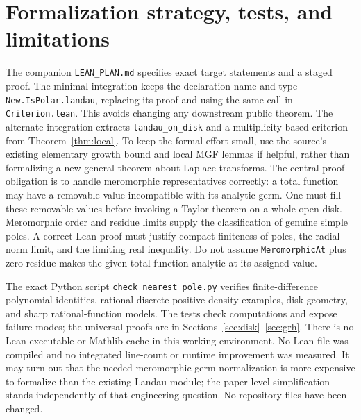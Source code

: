 \documentclass[11pt]{article}
\theoremstyle{remark}\newtheorem{remark}[theorem]{Remark}
\begin{document}
\section{Formalization strategy, tests, and limitations}\label{sec:formal}
The companion \texttt{LEAN\_PLAN.md} specifies exact target statements and a staged proof. The minimal integration keeps the declaration name and type \texttt{New.IsPolar.landau}, replacing its proof and using the same call in \texttt{Criterion.lean}. This avoids changing any downstream public theorem. The alternate integration extracts \texttt{landau\_on\_disk} and a multiplicity-based criterion from Theorem~\ref{thm:local}. To keep the formal effort small, use the source's existing elementary growth bound and local MGF lemmas if helpful, rather than formalizing a new general theorem about Laplace transforms. The central proof obligation is to handle meromorphic representatives correctly: a total function may have a removable value incompatible with its analytic germ. One must fill these removable values before invoking a Taylor theorem on a whole open disk. Meromorphic order and residue limits supply the classification of genuine simple poles. A correct Lean proof must justify compact finiteness of poles, the radial norm limit, and the limiting real inequality. Do not assume \texttt{MeromorphicAt} plus zero residue makes the given total function analytic at its assigned value.

The exact Python script \texttt{check\_nearest\_pole.py} verifies finite-difference polynomial identities, rational discrete positive-density examples, disk geometry, and sharp rational-function models. The tests check computations and expose failure modes; the universal proofs are in Sections~\ref{sec:disk}--\ref{sec:grh}. There is no Lean executable or Mathlib cache in this working environment. No Lean file was compiled and no integrated line-count or runtime improvement was measured. It may turn out that the needed meromorphic-germ normalization is more expensive to formalize than the existing Landau module; the paper-level simplification stands independently of that engineering question. No repository files have been changed.
\end{document}
